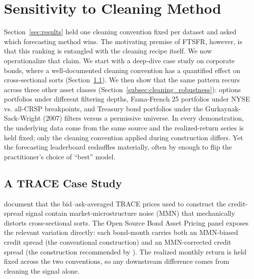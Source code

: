 \documentclass{article}
\begin{document}
\section{Sensitivity to Cleaning Method}
\label{sec:cleaning_sensitivity}

Section~\ref{sec:results} held one cleaning convention fixed per dataset and asked which forecasting method wins. The motivating premise of FTSFR, however, is that this ranking is entangled with the cleaning recipe itself. We now operationalize that claim. We start with a deep-dive case study on corporate bonds, where a well-documented cleaning convention has a quantified effect on cross-sectional sorts (Section~\ref{subsec:mmn_sensitivity}). We then show that the same pattern recurs across three other asset classes (Section~\ref{subsec:cleaning_robustness}): options portfolios under different filtering depths, Fama-French 25 portfolios under NYSE vs. all-CRSP breakpoints, and Treasury bond portfolios under the Gurkaynak-Sack-Wright (2007) filters versus a permissive universe. In every demonstration, the underlying data come from the same source and the realized-return series is held fixed; only the cleaning convention applied during construction differs. Yet the forecasting leaderboard reshuffles materially, often by enough to flip the practitioner's choice of ``best'' model.

\subsection{A TRACE Case Study}
\label{subsec:mmn_sensitivity}

\citet{Dickerson2024} document that the bid--ask-averaged TRACE prices used to construct the credit-spread signal contain market-microstructure noise (MMN) that mechanically distorts cross-sectional sorts. The Open Source Bond Asset Pricing panel exposes the relevant variation directly: each bond-month carries both an MMN-biased credit spread (the conventional construction) and an MMN-corrected credit spread (the construction recommended by \citealp{Dickerson2024}). The realized monthly return is held fixed across the two conventions, so any downstream difference comes from cleaning the signal alone.
\end{document}
